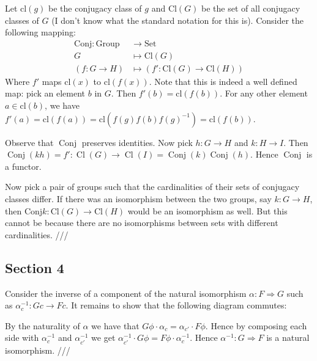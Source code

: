 \documentclass[12pt]{article}
\newcommand{\exercise}[1]{\fbox{\textbf{Exercise #1}}}
\newcommand{\ra}{\rightarrow}
\newcommand{\oper}{\operatorname}
\begin{document}
  \exercise{1.3.x} Let $\mathrm{cl}(g)$ be the conjugacy class of $g$ and $\mathrm{Cl}(G)$ be the set of all conjugacy classes of $G$ (I don't know what the standard notation for this is). Consider the following mapping:
  \begin{align*}
    \mathrm{Conj} : \mathrm{Group} &\longrightarrow \mathrm{Set} \\
    G &\longmapsto \text{Cl}(G) \\
    (f : G \ra H) &\longmapsto (f': \mathrm{Cl}(G) \ra \mathrm{Cl}(H))
  \end{align*}
  Where $f'$ maps $\mathrm{cl}(x)$ to $\mathrm{cl}(f(x))$. Note that this is indeed a well defined map: pick an element $b$ in $G$. Then $f'(b) = \mathrm{cl}(f(b))$. For any other element $a \in \mathrm{cl}(b)$, we have $f'(a) = \mathrm{cl}(f(a)) = \mathrm{cl}(f(g)f(b)f(g)^{-1}) = \mathrm{cl}(f(b))$. 

  Observe that $\oper{Conj}$ preserves identities. Now pick $h : G \ra H$ and $k : H \ra I$. Then $\oper{Conj}(kh) = f' : \oper{Cl}(G) \ra \oper{Cl}(I) = \oper{Conj}(k)\oper{Conj}(h)$. Hence $\oper{Conj}$ is a functor. 

  Now pick a pair of groups such that the cardinalities of their sets of conjugacy classes differ. If there was an isomorphism between the two groups, say $k : G \ra H$, then $\mathrm{Conj} k : \mathrm{Cl}(G) \ra \mathrm{Cl}(H)$ would be an isomorphism as well. But this cannot be because there are no isomorphisms between sets with different cardinalities. ///


  \subsection*{Section 4}

  \exercise{1.4.i} Consider the inverse of a component of the natural isomorphism $\alpha : F \Rightarrow G$ such as $\alpha^{-1}_c : Gc \ra Fc$. It remains to show that the following diagram commutes: 
  \begin{center}
  \end{center}

  By the naturality of $\alpha$ we have that $G\phi \cdot \alpha_c = \alpha_{c'} \cdot F\phi$. Hence by composing each side with $\alpha_c^{-1}$ and $\alpha_{c'}^{-1}$ we get $\alpha_{c'}^{-1} \cdot G\phi = F\phi \cdot \alpha_{c}^{-1}$. Hence $\alpha^{-1} : G \Rightarrow F$ is a natural isomorphism. ///
\end{document}
